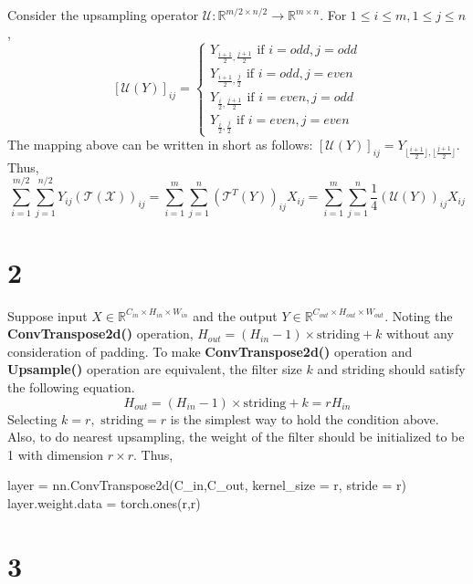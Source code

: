 \documentclass[10pt]{article}
\begin{document}
Consider the upsampling operator $\mathcal{U} : \mathbb{R}^{m/2\times n/2} \rightarrow \mathbb{R}^{m\times n}$. For $1\le i\le m, 1\le j\le n$,
\begin{equation*}
    \left[\mathcal{U}(Y)\right]_{ij} = \begin{cases}
        Y_{\frac{i+1}{2},\frac{j+1}{2}} \text{ if } i = odd, j = odd \\
        Y_{\frac{i+1}{2},\frac{j}{2}} \text{ if } i = odd, j = even \\
        Y_{\frac{i}{2},\frac{j+1}{2}} \text{ if } i = even, j = odd \\
        Y_{\frac{i}{2},\frac{j}{2}} \text{ if } i = even, j = even
    \end{cases}
\end{equation*}
The mapping above can be written in short as follows: $[\mathcal{U}(Y)]_{ij} = Y_{\lfloor\frac{i+1}{2}\rfloor,\lfloor\frac{j+1}{2}\rfloor}$.
Thus, 
\begin{equation*}
    \sum_{i=1}^{m/2}\sum_{j=1}^{n/2}Y_{ij}(\mathcal{T(X)})_{ij} = \sum_{i=1}^{m}\sum_{j=1}^{n}\left(\mathcal{T}^T(Y)\right)_{ij}X_{ij} = \sum_{i=1}^{m}\sum_{j=1}^{n}\frac{1}{4}\left(\mathcal{U}(Y)\right)_{ij}X_{ij}
\end{equation*}
\section*{2}
Suppose input $X \in \mathbb{R}^{C_{in}\times H_{in} \times W_{in}}$ and the output $Y \in \mathbb{R}^{C_{out}\times H_{out} \times W_{out}}$.
Noting the \textbf{ConvTranspose2d()} operation, $H_{out} = (H_{in}-1)\times \text{striding} + k$ without any consideration of padding. To make 
\textbf{ConvTranspose2d()} operation and \textbf{Upsample()} operation are equivalent, the filter size $k$ and striding should satisfy the following equation.
\begin{equation*}
    H_{out} = (H_{in}-1)\times \text{striding} + k = rH_{in}
\end{equation*}
Selecting $k = r, \text{ striding} = r$ is the simplest way to hold the condition above. Also, to do nearest upsampling, the weight of the filter should be initialized to be 1 with dimension $r\times r$.
Thus,
\begin{python}
layer = nn.ConvTranspose2d(C_in,C_out, kernel_size = r, stride = r)
layer.weight.data = torch.ones(r,r)
\end{python}
\section*{3}
\end{document}
